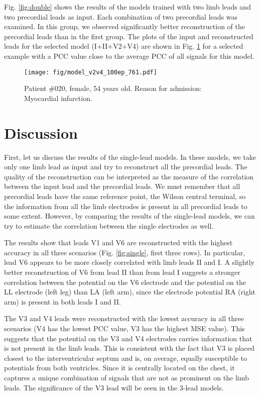 \documentclass[preprint,12pt]{elsarticle}
\begin{document}
Fig. \ref{fig:double} shows the results of the models trained with two limb leads and two precordial leads as input. Each combination of two precordial leads was examined. In this group, we observed significantly better reconstruction of the precordial leads than in the first group. The plots of the input and reconstructed leads for the selected model (I+II+V2+V4) are shown in Fig. \ref{fig:v2v4_ex1} for a selected example with a PCC value close to the average PCC of all signals for this model.

\begin{figure}[h]
    \centering
    \texttt{[image: fig/model\_v2v4\_100ep\_761.pdf]}
    \caption{Patient \#020, female, 54 years old. Reason for admission: Myocardial infarction.}\label{fig:v2v4_ex1}
\end{figure}

\section{Discussion}

First, let us discuss the results of the single-lead models. In these models, we take only one limb lead as input and try to reconstruct all the precordial leads. The quality of the reconstruction can be interpreted as the measure of the correlation between the input lead and the precordial leads. We must remember that all precordial leads have the same reference point, the Wilson central terminal, so the information from all the limb electrodes is present in all precordial leads to some extent. However, by comparing the results of the single-lead models, we can try to estimate the correlation between the single electrodes as well.

The results show that leads V1 and V6 are reconstructed with the highest accuracy in all three scenarios (Fig. \ref{fig:single}, first three rows). In particular, lead V6 appears to be more closely correlated with limb leads II and I. A slightly better reconstruction of V6 from lead II than from lead I suggests a stronger correlation between the potential on the V6 electrode and the potential on the LL electrode (left leg) than LA (left arm), since the electrode potential RA (right arm) is present in both leads I and II.

The V3 and V4 leads were reconstructed with the lowest accuracy in all three scenarios (V4 has the lowest PCC value, V3 has the highest MSE value). This suggests that the potential on the V3 and V4 electrodes carries information that is not present in the limb leads. This is consistent with the fact that V3 is placed closest to the interventricular septum and is, on average, equally susceptible to potentials from both ventricles. Since it is centrally located on the chest, it captures a unique combination of signals that are not as prominent on the limb leads. The significance of the V3 lead will be seen in the 3-lead models.
\end{document}
